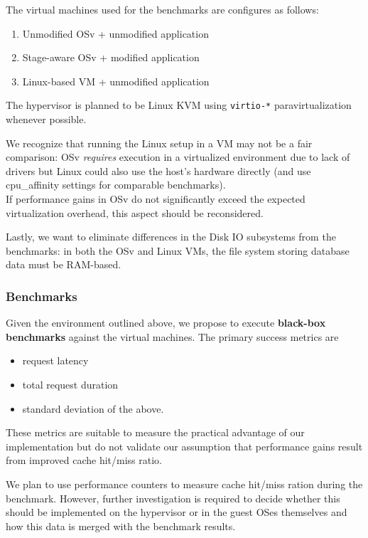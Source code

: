 \documentclass{article}
\begin{document}
The virtual machines used for the benchmarks are configures as follows:
\begin{enumerate}
    \item Unmodified OSv + unmodified application
    \item Stage-aware OSv + modified application
    \item \label{linuxvmsetup} Linux-based VM + unmodified application
\end{enumerate}
The hypervisor is planned to be Linux KVM using \texttt{virtio-*} paravirtualization whenever possible.

We recognize that running the Linux setup in a VM may not be a fair comparison:
OSv \emph{requires} execution in a virtualized environment due to lack of drivers
but Linux could also use the host's hardware directly (and use cpu\_affinity settings for comparable benchmarks).\\
If performance gains in OSv do not significantly exceed the expected virtualization overhead, this aspect should be reconsidered.

Lastly, we want to eliminate differences in the Disk IO subsystems from the benchmarks:
in both the OSv and Linux VMs, the file system storing database data must be RAM-based.

\subsubsection{Benchmarks}

Given the environment outlined above, we propose to execute \textbf{black-box benchmarks} against the virtual machines.
The primary success metrics are
\begin{itemize}
    \item request latency
    \item total request duration
    \item standard deviation of the above.
\end{itemize}

These metrics are suitable to measure the practical advantage of our implementation but
do not validate our assumption that performance gains result from improved cache hit/miss ratio.

We plan to use performance counters to measure cache hit/miss ration during the benchmark.
However, further investigation is required to decide whether this should be implemented on the hypervisor or in the guest OSes themselves
and how this data is merged with the benchmark results.
\end{document}
